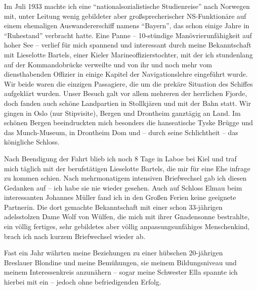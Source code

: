 Im Juli 1933 machte ich eine \enquote{nationalsozialistische Studienreise} nach Norwegen mit, unter Leitung wenig gebildeter aber großsprecherischer NS-Funktionäre auf einem ehemaligen Auswandererschiff namens \enquote{Bayern}, das schon einige Jahre in \enquote{Ruhestand} verbracht hatte. Eine Panne -- 10-stündige Manövrierunfähigkeit auf hoher See -- verlief für mich spannend und interessant durch meine Bekanntschaft mit Lieselotte Bartels, einer Kieler Marineoffizierstochter, mit der ich stundenlang auf der Kommandobrücke verweilte und von ihr und noch mehr vom diensthabenden Offizier in einige Kapitel der Navigationslehre eingeführt wurde. Wir beide waren die einzigen Passagiere, die um die prekäre Situation des Schiffes aufgeklärt wurden. Unser Besuch galt vor allem mehreren der herrlichen Fjorde, doch fanden auch schöne Landpartien in Stollkjären und mit der Bahn statt. Wir gingen in Oslo (nur Stipvisite), Bergen und Drontheim ganztägig an Land. Im schönen Bergen beeindruckten mich besonders die hanseatische Tyske Brügge und das Munch-Museum, in Drontheim Dom und -- durch seine Schlichtheit -- das königliche Schloss.

Nach Beendigung der Fahrt blieb ich noch 8 Tage in Laboe bei Kiel und traf mich täglich mit der berufstätigen Lieselotte Bartels, die mir für eine Ehe infrage zu kommen schien. Nach mehrmonatigem intensiven Briefwechsel gab ich diesen Gedanken auf -- ich habe sie nie wieder gesehen. Auch auf Schloss Elmau beim interessanten Johannes Müller fand ich in den Großen Ferien keine geeignete Partnerin. Die dort gemachte Bekanntschaft mit einer schon 33-jährigen adelsstolzen Dame Wolf von Wülfen, die mich mit ihrer Gnadensonne bestrahlte, ein völlig fertiges, sehr gebildetes aber völlig anpassungsunfähiges Menschenkind, brach ich nach kurzem Briefwechsel wieder ab.

Fast ein Jahr währten meine Beziehungen zu einer hübschen 20-jährigen Breslauer Blondine und meine Bemühungen, sie meinem Bildungsniveau und meinem Interessenkreis anzunähern -- sogar meine Schwester Ella spannte ich hierbei mit ein -- jedoch ohne befriedigenden Erfolg.


